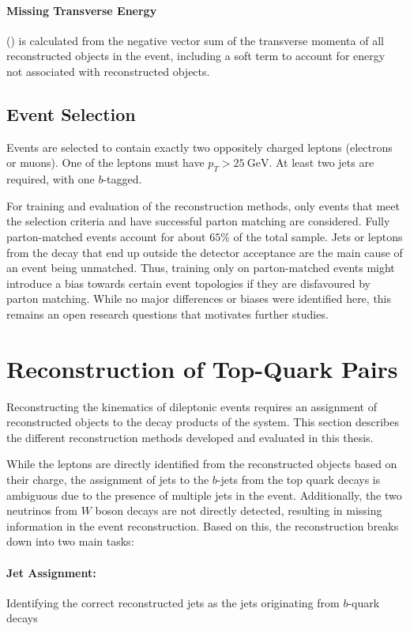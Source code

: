 \paragraph{Missing Transverse Energy} (\met) is calculated from the negative vector sum of the transverse momenta of all reconstructed objects in the event, including a soft term to account for energy not associated with reconstructed objects.

\subsection{Event Selection}
\label{sec:event-selection}
Events are selected to contain exactly two oppositely charged leptons (electrons or muons). One of the leptons must have $p_T>\qty{25}{\giga\electronvolt}$. At least two jets are required, with one $b$-tagged.

For training and evaluation of the reconstruction methods, only events that meet the selection criteria and have successful parton matching are considered. Fully parton-matched events account for about $65\%$ of the total sample. Jets or leptons from the \ttbar decay that end up outside the detector acceptance are the main cause of an event being unmatched. Thus, training only on parton-matched events might introduce a bias towards certain event topologies if they are disfavoured by parton matching. While no major differences or biases were identified here, this remains an open research questions that motivates further studies.

\section{Reconstruction of Top-Quark Pairs}
\label{sec:reconstruction-methods}
Reconstructing the kinematics of dileptonic \ttbar events requires an assignment of reconstructed objects to the decay products of the \ttbar system. This section describes the different reconstruction methods developed and evaluated in this thesis.

While the leptons are directly identified from the reconstructed objects based on their charge, the assignment of jets to the $b$-jets from the top quark decays is ambiguous due to the presence of multiple jets in the event. Additionally, the two neutrinos from $W$ boson decays are not directly detected, resulting in missing information in the event reconstruction. Based on this, the reconstruction breaks down into two main tasks:
\paragraph{Jet Assignment:} Identifying the correct reconstructed jets as the jets originating from $b$-quark decays
